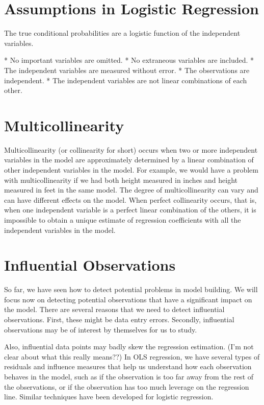 



\tableofcontents
\section{Assumptions in Logistic Regression}

The true conditional probabilities are a logistic function of the independent variables.

*  No important variables are omitted.
*  No extraneous variables are included.
*  The independent variables are measured without error.
*  The observations are independent.
*  The independent variables are not linear combinations of each other.

\section{Multicollinearity}

Multicollinearity (or collinearity for short) occurs when two or more independent variables in the model are approximately determined by a linear combination of other independent variables in the model. For example, we would have a problem with multicollinearity if we had both height measured in inches and height measured in feet in the same model. The degree of multicollinearity can vary and can have different effects on the model. When perfect collinearity occurs, that is, when one independent variable is a perfect linear combination of the others, it is impossible to obtain a unique estimate of regression coefficients with all the independent variables in the model.

\section{Influential Observations}

So far, we have seen how to detect potential problems in model building. We will focus now on detecting potential observations that have a significant impact on the model. There are several reasons that we need to detect influential observations. First, these might be data entry errors. Secondly, influential observations may be of interest by themselves for us to study. 

Also, influential data points may badly skew the regression estimation. (I'm not clear about what this really means??) In OLS regression, we have several types of  residuals and influence measures that help us understand how each observation behaves in the model, such as if the observation is too far away from the rest of the observations, or if the observation has too much leverage on the regression line. Similar techniques have been developed for logistic regression.

